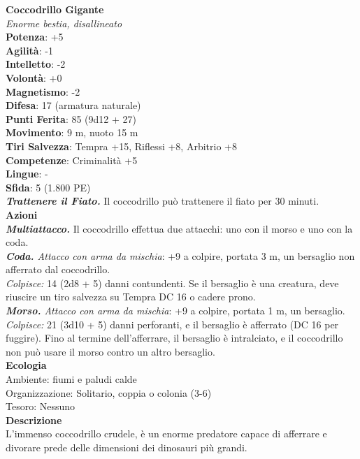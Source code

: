 \begin{multicols}{2}
\medskip\textbf{Coccodrillo Gigante}\\
\emph{Enorme bestia, disallineato}\\
\textbf{Potenza}: +5\\
\textbf{Agilità}: -1\\
\textbf{Intelletto}: -2\\
\textbf{Volontà}: +0\\
\textbf{Magnetismo}: -2\\
\textbf{Difesa}: 17 (armatura naturale)\\
\textbf{Punti Ferita}: 85 (9d12 + 27)\\
\textbf{Movimento}: 9 m, nuoto 15 m\\
\textbf{Tiri Salvezza}: Tempra +15, Riflessi +8, Arbitrio +8 \\
\textbf{Competenze}: Criminalità +5\\
\textbf{Lingue}: -\\
\textbf{Sfida}: 5 (1.800 PE)\smallskip\\
\emph{\textbf{Trattenere il Fiato.}} Il coccodrillo può trattenere il fiato per 30 minuti.\\
\smallskip\textbf{Azioni}\\
\emph{\textbf{Multiattacco.}} Il coccodrillo effettua due attacchi: uno con il morso e uno con la coda.\\
\emph{\textbf{Coda.} Attacco con arma da mischia}: +9 a colpire, portata 3 m, un bersaglio non afferrato dal coccodrillo.\\
\emph{Colpisce:} 14 (2d8 + 5) danni contundenti. Se il bersaglio è una creatura, deve riuscire un tiro salvezza su Tempra DC 16 o cadere prono.\\
\emph{\textbf{Morso.} Attacco con arma da mischia}: +9 a colpire, portata 1 m, un bersaglio.\\
\emph{Colpisce:} 21 (3d10 + 5) danni perforanti, e il bersaglio è afferrato (DC 16 per fuggire). Fino al termine dell'afferrare, il bersaglio è intralciato, e il coccodrillo non può usare il morso contro un altro bersaglio.\\
\textbf{Ecologia}\\
Ambiente: fiumi e paludi calde\\
Organizzazione: Solitario, coppia o colonia (3-6)\\
Tesoro: Nessuno\\
\textbf{Descrizione}\\

L’immenso coccodrillo crudele, è un enorme predatore capace di afferrare e divorare prede delle dimensioni dei dinosauri più grandi. \\



\end{multicols}
